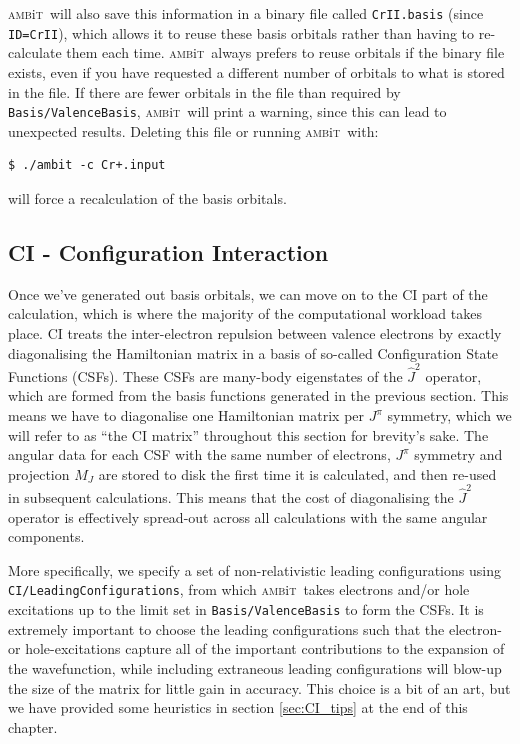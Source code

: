 \documentclass{report}
\newcommand{\ambit}{\textsc{amb}{\footnotesize i}\textsc{t}}
\begin{document}
\ambit\  will also save this information in a binary file called \texttt{CrII.basis} (since
\texttt{ID=CrII}), which allows it to reuse these basis orbitals rather than having to re-calculate them
each time. \ambit\  always prefers to reuse orbitals if the binary file exists, even if you have
requested a different number of orbitals to what is stored in the file. If there are fewer orbitals in
the file than required by \texttt{Basis/ValenceBasis}, \ambit\  will print a warning, since this can lead
to unexpected results. Deleting this file or running \ambit\  with:

\begin{verbatim}
$ ./ambit -c Cr+.input
\end{verbatim}

will force a recalculation of the basis orbitals.

\subsection{CI - Configuration Interaction}

Once we've generated out basis orbitals, we can move on to the CI part of the calculation, which is
where the majority of the computational workload takes place. CI treats the inter-electron repulsion
between valence electrons by exactly diagonalising the Hamiltonian matrix in a basis of so-called
Configuration State Functions (CSFs). These CSFs are many-body eigenstates of the $\hat{J}^2$
operator, which are formed from the basis functions generated in the previous section. This means we
have to diagonalise one Hamiltonian matrix per $J^{\pi}$ symmetry, which we will refer to as ``the CI 
matrix'' throughout this section for brevity's sake.  The angular data for each CSF with the same number
of electrons, $J^{\pi}$ symmetry and projection $M_J$ are stored to disk the first time it is
calculated, and then re-used in subsequent calculations. This means that the cost of diagonalising the
$\hat{J}^2$ operator is effectively spread-out across all calculations with the same angular components.

More specifically, we specify a set of non-relativistic leading configurations using 
\texttt{CI/LeadingConfigurations}, from which \ambit\  takes electrons and/or hole excitations up to the
limit set in \texttt{Basis/ValenceBasis} to form the CSFs. It is extremely important to choose the
leading configurations such that the electron- or hole-excitations capture all of the important
contributions to the expansion of the wavefunction, while including extraneous leading configurations
will blow-up the size of the matrix for little gain in accuracy. This choice is a bit of an art, but we
have provided some heuristics in section \ref{sec:CI_tips} at the end of this chapter.
\end{document}
